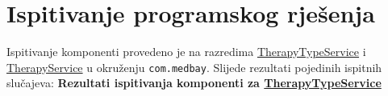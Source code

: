 			\eject 
		
	
			\section{Ispitivanje programskog rješenja}
			
			Ispitivanje komponenti provedeno je na razredima  \href{https://github.com/Project-MedBay/backend/blob/main/src/test/java/com/medbay/TherapyTypeServiceTest.java}{TherapyTypeService} 
			i \href{https://github.com/Project-MedBay/backend/blob/main/src/test/java/com/medbay/TherapyServiceTest.java}{TherapyService} u okruženju \texttt{com.medbay}. Slijede rezultati pojedinih ispitnih slučajeva:
			\newline \textbf{Rezultati ispitivanja komponenti za \href{https://github.com/Project-MedBay/backend/blob/main/src/test/java/com/medbay/TherapyTypeServiceTest.java}{TherapyTypeService}}

